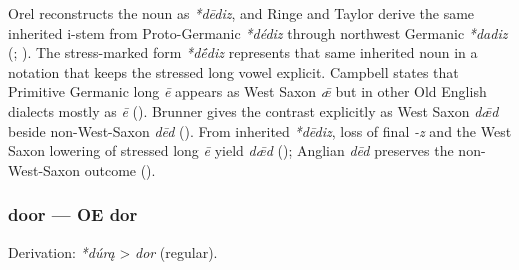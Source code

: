 \documentclass[
  british,
  a4paper,
]{article}
\begin{document}
Orel reconstructs the noun as \emph{*dēdiz}, and Ringe and Taylor derive
the same inherited i-stem from Proto-Germanic \emph{*dédiz} through
northwest Germanic \emph{*dadiz} (; ). The
stress-marked form \emph{*dḗdiz} represents that same inherited noun in
a notation that keeps the stressed long vowel explicit. Campbell states
that Primitive Germanic long \emph{ē} appears as West Saxon \emph{ǣ} but
in other Old English dialects mostly as \emph{ē}
(). Brunner gives
the contrast explicitly as West Saxon \emph{dǣd} beside non-West-Saxon
\emph{dēd} ().
From inherited \emph{*dēdiz}, loss of final \emph{-z} and the West Saxon
lowering of stressed long \emph{ē} yield \emph{dǣd}
(); Anglian
\emph{dēd} preserves the non-West-Saxon outcome
().

\subsubsection{door --- OE dor}\label{door-oe-dor}

Derivation: \emph{*dúrą} \textgreater{} \emph{dor} (regular).

\begingroup
\setlength{\fboxsep}{6pt}
\end{document}
